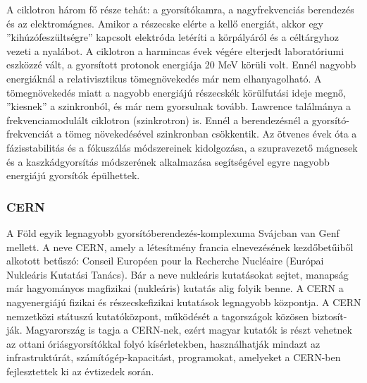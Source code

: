 \documentclass[../main.tex]{subfiles}
\begin{document}
A ciklotron három fő része tehát: a gyorsítókamra, a nagyfrekvenciás berendezés és az
elektromágnes. Amikor a részecske elérte a kellő energiát, akkor egy ”kihúzófeszültségre”
kapcsolt elektróda letéríti a körpályáról és a céltárgyhoz vezeti a nyalábot.
A ciklotron a harmincas évek végére elterjedt laboratóriumi eszközzé vált, a gyorsított protonok energiája 20 MeV körüli volt. Ennél nagyobb energiáknál a relativisztikus
tömegnövekedés már nem elhanyagolható. A tömegnövekedés miatt
a nagyobb energiájú részecskék körülfutási ideje megnő, ”kiesnek” a szinkronból, és már
nem gyorsulnak tovább. Lawrence találmánya a frekvenciamodulált ciklotron (szinkrotron) is. Ennél a berendezésnél a gyorsító-frekvenciát a tömeg növekedésével szinkronban
csökkentik. Az ötvenes évek óta a fázisstabilitás és a fókuszálás módszereinek kidolgozása, a szupravezető mágnesek és a kaszkádgyorsítás módszerének alkalmazása segítségével
egyre nagyobb energiájú gyorsítók épülhettek.

\subsubsection{CERN}
A Föld egyik legnagyobb gyorsítóberendezés-komplexuma Svájcban van Genf mellett.
A neve CERN, amely a létesítmény francia elnevezésének kezdőbetűiből alkotott betűszó: Conseil Européen pour la Recherche Nucléaire (Európai Nukleáris Kutatási Tanács).
Bár a neve nukleáris kutatásokat sejtet, manapság már hagyományos magfizikai (nukleáris) kutatás alig folyik benne. A
CERN a nagyenergiájú fizikai és részecskefizikai kutatások legnagyobb központja. A
CERN nemzetközi státuszú kutatóközpont, működését a tagországok közösen biztosít-
ják. Magyarország is tagja a CERN-nek, ezért magyar kutatók is részt vehetnek az
ottani óriásgyorsítókkal folyó kísérletekben, használhatják mindazt az infrastruktúrát,
számítógép-kapacitást, programokat, amelyeket a CERN-ben fejlesztettek ki az évtizedek során.
\end{document}
